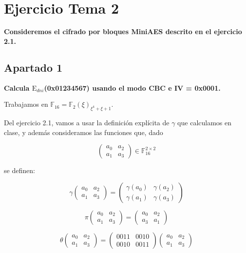 \documentclass[a4paper]{article}
\title {\fbox{\Huge{\textbf{Ejercicio Tema 2}}}}
\author {\fbox{Ana Buendía Ruiz-Azuaga}}
\begin{document}
\maketitle


\section{Ejercicio Tema 2}

\textbf{Consideremos el cifrado por bloques MiniAES descrito en
el ejercicio 2.1.}

\subsection{Apartado 1}

\textbf{Calcula $\text{E}_{dni}$(0x01234567) usando el modo CBC e IV = 0x0001.}

Trabajamos en $\mathbb{F}_{16}=\mathbb{F}_2(\xi )_{\xi^4+\xi+1}$.

Del ejercicio 2.1, vamos a usar la definición explícita de $\gamma$ que calculamos en clase, y además consideramos las funciones que, dado

$$\begin{pmatrix} a_0 & a_2 \\ a_1 & a_3 \end{pmatrix} \in \mathbb{F}_{16}^{2\times 2}$$

se definen:

$$\gamma \begin{pmatrix} a_0 & a_2 \\ a_1 & a_3 \end{pmatrix} = \begin{pmatrix} \gamma (a_0) & \gamma (a_2) \\ \gamma (a_1) & \gamma (a_3) \end{pmatrix}$$

$$\pi \begin{pmatrix} a_0 & a_2 \\ a_1 & a_3 \end{pmatrix} = \begin{pmatrix} a_0 & a_2 \\ a_3 & a_1 \end{pmatrix}$$

$$\theta \begin{pmatrix} a_0 & a_2 \\ a_1 & a_3 \end{pmatrix} = \begin{pmatrix} 0011 & 0010 \\ 0010 & 0011 \end{pmatrix}\begin{pmatrix} a_0 & a_2 \\ a_1 & a_3 \end{pmatrix}$$
\end{document}
